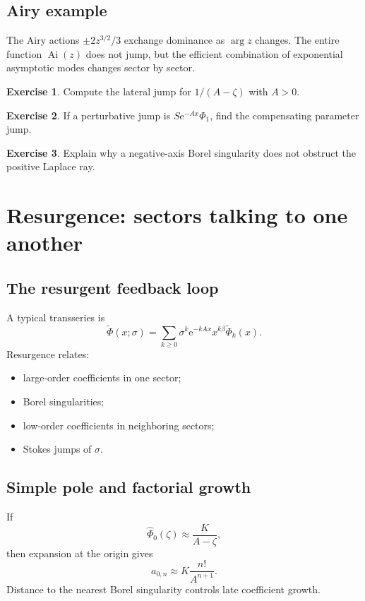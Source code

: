 \documentclass[11pt,oneside,openany]{book}
\newcommand{\Ai}{\operatorname{Ai}}
\newcommand{\e}{\mathrm{e}}
\theoremstyle{plain}
\theoremstyle{definition}
\newtheorem{exercise}{Exercise}[chapter]
\theoremstyle{remark}
\begin{document}
\section{Airy example}
The Airy actions $\pm2z^{3/2}/3$ exchange dominance as $\arg z$ changes. The entire function $\Ai(z)$ does not jump, but the efficient combination of exponential asymptotic modes changes sector by sector.

\begin{exercise}
Compute the lateral jump for $1/(A-\zeta)$ with $A>0$.
\end{exercise}

\begin{exercise}
If a perturbative jump is $S\e^{-Ax}\Phi_1$, find the compensating parameter jump.
\end{exercise}

\begin{exercise}
Explain why a negative-axis Borel singularity does not obstruct the positive Laplace ray.
\end{exercise}


\chapter{Resurgence: sectors talking to one another}
\label{ch:resurgence}

\section{The resurgent feedback loop}
A typical transseries is
\[
  \widetilde\Phi(x;\sigma)
  =\sum_{k\ge0}\sigma^k\e^{-kAx}x^{k\beta}
  \widetilde\Phi_k(x).
\]
Resurgence relates:
\begin{itemize}
  \item large-order coefficients in one sector;
  \item Borel singularities;
  \item low-order coefficients in neighboring sectors;
  \item Stokes jumps of $\sigma$.
\end{itemize}

\section{Simple pole and factorial growth}
If
\[
  \widehat\Phi_0(\zeta)\approx\frac{K}{A-\zeta},
\]
then expansion at the origin gives
\[
  a_{0,n}\approx K\frac{n!}{A^{n+1}}.
\]
Distance to the nearest Borel singularity controls late coefficient growth.
\end{document}
